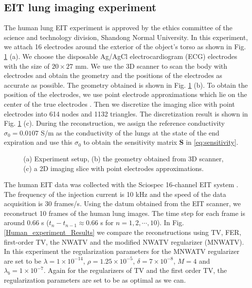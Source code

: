 \documentclass[lettersize,journal]{IEEEtran}
\begin{document}
\subsection{EIT lung imaging experiment}

The human lung EIT experiment is approved by the ethics committee of the science and technology division, Shandong Normal University.
In this experiment, we attach 16 electrodes \cite{Company} around the exterior of the object's torso as shown in Fig. \ref{Human experiment mesurement systerm} (a). We choose the disposable Ag/AgCl electrocardiogram (ECG) electrodes with the size of $20\times 27$ mm. We use the 3D scanner \cite{Sense3D} to scan the body with electrodes and obtain the geometry and the positions of the electrodes as accurate as possible.
The geometry obtained is shown in Fig. \ref{Human experiment mesurement systerm} (b). To obtain the position of the electrodes, we use point electrode  approximations which lie on the center of the true electrodes \cite{Hanke2011}.
Then we discretize the imaging slice with point electrodes into 614 nodes and 1132 triangles. The discretization result is shown in Fig. \ref{Human experiment mesurement systerm} (c). During the reconstruction, we assign the reference conductivity $\sigma_0 = 0.0107$ S/m \cite{Adler2006} as the conductivity of the lungs at the state of the end expiration and use this $\sigma_0$ to obtain the sensitivity matrix $\mathbf{S}$ in \eqref{eq:sensitivity}.
\begin{figure}[h]
\centering
{}
\centering
\caption{(a) Experiment setup, (b) the geometry obtained from 3D scanner, (c) a 2D imaging slice with point electrodes approximations.}
\label{Human experiment mesurement systerm}
\end{figure}

The human EIT data was collected with the Sciospec 16-channel EIT system \cite{EIT}.
The frequency of the injection current is 10 kHz and the speed of the data acquisition is 30 frames/s.
Using the datum obtained from the EIT scanner, we reconstruct 10 frames of the human lung images.
The time step for each frame is around 0.66 s ($t_n - t_{n-1} \approx 0.66$ s for $n=1,2,\cdots,10$). %
In Fig. \ref{Human_experiment_Results} we compare the reconstructions using TV, FER, first-order TV, the NWATV and the modified NWATV regularizer (MNWATV). In this experiment the regularization parameters for the MNWATV regularizer are set to be $\lambda=1\times 10^{-14}$, $\rho=1.25 \times 10^{-5}$, $\delta=7\times 10^{-8}$, $M= 4$ and $\lambda_b=1 \times 10^{-7}$. Again for the regularizers of TV and the first order TV, the regularization parameters are set to be as optimal as we can.
\end{document}
